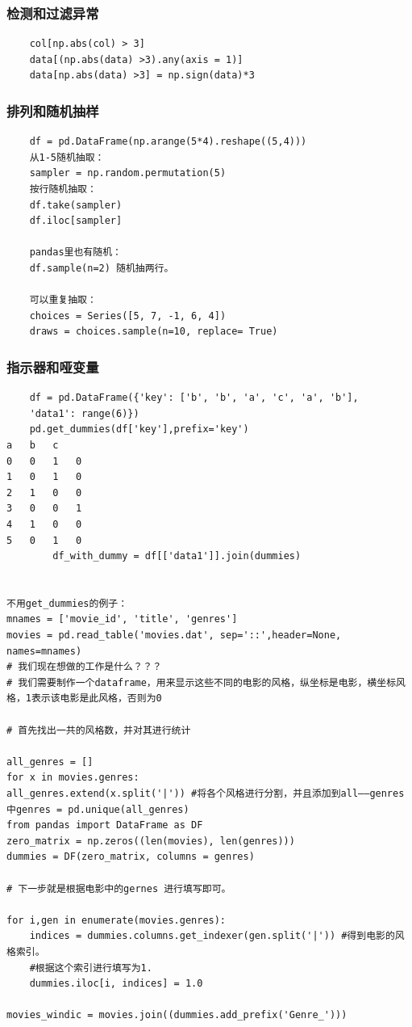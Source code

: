 \documentclass{article}
\begin{document}
\subsubsection{检测和过滤异常}

\begin{lstlisting}
	col[np.abs(col) > 3]
	data[(np.abs(data) >3).any(axis = 1)]
	data[np.abs(data) >3] = np.sign(data)*3 	
\end{lstlisting}
\subsubsection{排列和随机抽样}
\begin{lstlisting}
	df = pd.DataFrame(np.arange(5*4).reshape((5,4)))
	从1-5随机抽取：
	sampler = np.random.permutation(5)
	按行随机抽取：
	df.take(sampler)
	df.iloc[sampler] 
	
	pandas里也有随机：
	df.sample(n=2) 随机抽两行。
	
	可以重复抽取：
	choices = Series([5, 7, -1, 6, 4])
	draws = choices.sample(n=10, replace= True)
\end{lstlisting}

\subsubsection{指示器和哑变量}

\begin{lstlisting}
	df = pd.DataFrame({'key': ['b', 'b', 'a', 'c', 'a', 'b'],
	'data1': range(6)})
	pd.get_dummies(df['key'],prefix='key')
a	b	c
0	0	1	0
1	0	1	0
2	1	0	0
3	0	0	1
4	1	0	0
5	0	1	0
		df_with_dummy = df[['data1']].join(dummies)


不用get_dummies的例子：		
mnames = ['movie_id', 'title', 'genres']
movies = pd.read_table('movies.dat', sep='::',header=None, names=mnames)
# 我们现在想做的工作是什么？？？
# 我们需要制作一个dataframe，用来显示这些不同的电影的风格，纵坐标是电影，横坐标风格，1表示该电影是此风格，否则为0

# 首先找出一共的风格数，并对其进行统计

all_genres = []
for x in movies.genres:
all_genres.extend(x.split('|')) #将各个风格进行分割，并且添加到all——genres中genres = pd.unique(all_genres)
from pandas import DataFrame as DF
zero_matrix = np.zeros((len(movies), len(genres)))
dummies = DF(zero_matrix, columns = genres)

# 下一步就是根据电影中的gernes 进行填写即可。

for i,gen in enumerate(movies.genres):
	indices = dummies.columns.get_indexer(gen.split('|')) #得到电影的风格索引。
	#根据这个索引进行填写为1.
	dummies.iloc[i, indices] = 1.0

movies_windic = movies.join((dummies.add_prefix('Genre_')))

		
\end{lstlisting}
\end{document}
